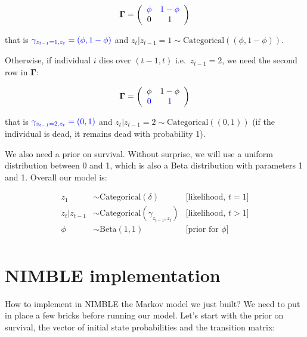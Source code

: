 \documentclass[
  12pt,
]{krantz}
\begin{document}
\begin{align*}
\mathbf{\Gamma} =
\left(\begin{array}{cc}
\color{blue}{\phi} & \color{blue}{1 - \phi}\\
0 & 1
\end{array}\right)
\end{align*}

that is \(\color{blue}{\gamma_{z_{t-1} = 1,z_{t}} = (\phi, 1-\phi)}\) and \(z_t | z_{t-1} = 1 \sim \text{Categorical}((\phi, 1-\phi))\).

Otherwise, if individual \(i\) dies over \((t-1,t)\) i.e.~\(z_{t-1} = 2\), we need the second row in \(\mathbf{\Gamma}\):

\begin{align*}
\mathbf{\Gamma} =
\left(\begin{array}{cc}
\phi & 1 - \phi\\
\color{blue}{0} & \color{blue}{1}
\end{array}\right)
\end{align*}

that is \(\color{blue}{\gamma_{z_{t-1} = 2,z_{t}} = (0, 1)}\) and \(z_t | z_{t-1} = 2 \sim \text{Categorical}((0, 1))\) (if the individual is dead, it remains dead with probability 1).

We also need a prior on survival. Without surprise, we will use a uniform distribution between 0 and 1, which is also a Beta distribution with parameters 1 and 1. Overall our model is:

\begin{align*}
   z_1 &\sim \text{Categorical}(\delta) &\text{[likelihood, }t = 1 \text{]}\\
   z_t | z_{t-1} &\sim \text{Categorical}(\gamma_{z_{t-1},z_{t}}) &\text{[likelihood, }t > 1 \text{]}\\
  \phi &\sim \text{Beta}(1, 1) &\text{[prior for }\phi \text{]} \\
\end{align*}

\hypertarget{nimble-implementation}{%
\section{NIMBLE implementation}\label{nimble-implementation}}

How to implement in NIMBLE the Markov model we just built? We need to put in place a few bricks before running our model. Let's start with the prior on survival, the vector of initial state probabilities and the transition matrix:
\end{document}
